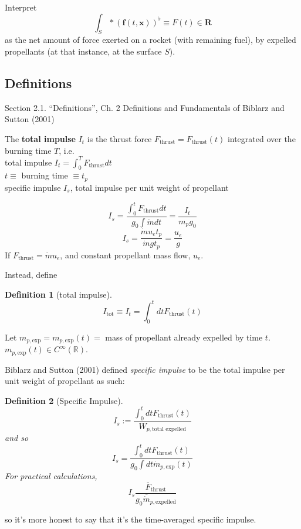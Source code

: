 \documentclass[10pt]{amsart}
\newtheorem{definition}{Definition}
\begin{document}
\begin{multicols*}{2}
Interpret 
\begin{equation}
\int_S * (\mathbf{f}(t, \mathbf{x}))^{\flat} \equiv F(t) \in \mathbf{R}
\end{equation}
as the net amount of force exerted on a rocket (with remaining fuel), by expelled propellants (at that instance, at the surface $S$).




\subsection{Definitions}

Section 2.1. ``Definitions'', Ch. 2 Definitions and Fundamentals of Biblarz and Sutton (2001) \cite{GSuttonOBiblarz2001} 

The \textbf{total impulse} $I_t$ is the thrust force $F_{\text{thrust}} = F_{\text{thrust}}(t)$ integrated over the burning time $T$, i.e. \\

total impulse $I_t = \int_0^T F_{\text{thrust}} dt $ \\
$t\equiv $ burning time $ \equiv t_p$ \\

specific impulse $I_s$, total impulse per unit weight of propellant

\[
I_s = \frac{ \int_0^t F_{\text{thrust}} dt }{ g_0 \int \dot{m} dt } = \frac{I_t}{ m_p g_0}
\]
\[
I_s = \frac{ \dot{m} u_e t_p }{ \dot{m} g t_p } = \frac{u_e}{g}
\]
If $F_{\text{thrust}} = \dot{m} u_e$, and constant propellant mass flow, $u_e$.

Instead, define 
\begin{definition}[total impulse]
\begin{equation}
\boxed{ I_{\text{tot}} \equiv I_t = \int_0^t dt F_{\text{thrust}}(t)	}
\end{equation}
\end{definition}

Let $m_{p, \text{exp}} = m_{p, \text{exp}}(t) = $ mass of propellant already expelled by time $t$. $m_{p, \text{exp}}(t) \in C^{\infty}(\mathbb{R})$.

Biblarz and Sutton (2001) \cite{GSuttonOBiblarz2001} defined \emph{specific impulse} to be the total impulse per unit weight of propellant as such:
\begin{definition}[Specific Impulse]
\begin{equation}
\boxed{ I_s := \frac{  \int_0^t dt F_{\text{thrust}}(t) }{ W_{p, \text{total expelled} }} }
\end{equation}
and so 
\begin{equation}
I_s = \frac{\int_0^t dt F_{\text{thrust}}(t) }{ g_0 \int dt \dot{m}_{p, \text{exp}}(t)}
\end{equation}
For practical calculations, 
\begin{equation}
I_s \frac{ \overline{F}_{\text{thrust} } }{ g_0 \overline{\dot{m}}_{p, \text{expelled}}  }
\end{equation}
\end{definition}
so it's more honest to say that it's the time-averaged specific impulse.


\end{multicols*}
\end{document}
